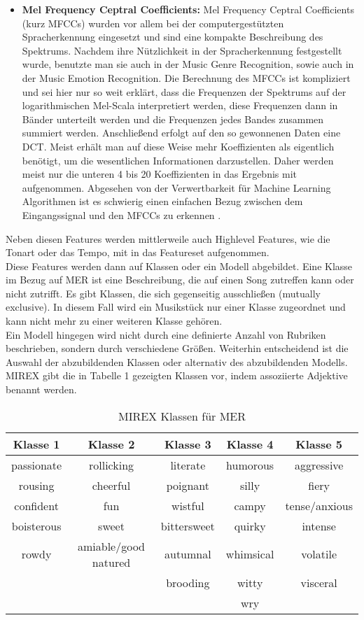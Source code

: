\documentclass[11pt,a4paper]{article}
\begin{document}
\begin{itemize}
\item \textbf{Mel Frequency Ceptral Coefficients:} Mel Frequency Ceptral Coefficients (kurz MFCCs) wurden vor allem bei der computergestützten Spracherkennung eingesetzt und sind eine kompakte Beschreibung des Spektrums. Nachdem ihre Nützlichkeit in der Spracherkennung festgestellt wurde, benutzte man sie auch in der Music Genre Recognition, sowie auch in der Music Emotion Recognition. Die Berechnung des MFCCs ist kompliziert und sei hier nur so weit erklärt, dass die Frequenzen der Spektrums auf der logarithmischen Mel-Scala interpretiert werden, diese Frequenzen dann in Bänder unterteilt werden und die Frequenzen jedes Bandes zusammen summiert werden. Anschließend erfolgt auf den so gewonnenen Daten eine DCT. Meist erhält man auf diese Weise mehr Koeffizienten als eigentlich benötigt, um die wesentlichen Informationen darzustellen. Daher werden meist nur die unteren 4 bis 20 Koeffizienten in das Ergebnis mit aufgenommen. Abgesehen von der Verwertbarkeit für Machine Learning Algorithmen ist es schwierig einen einfachen Bezug zwischen dem Eingangssignal und den MFCCs zu erkennen \cite[S. 41 ff.]{lerch2012introduction}.
\end{itemize}
Neben diesen Features werden mittlerweile auch Highlevel Features, wie die Tonart oder das Tempo, mit in das Featureset aufgenommen.\\
Diese Features werden dann auf Klassen oder ein Modell abgebildet. Eine Klasse im Bezug auf MER ist eine Beschreibung, die auf einen Song zutreffen kann oder nicht zutrifft. Es gibt Klassen, die sich gegenseitig ausschließen (mutually exclusive). In diesem Fall wird ein Musikstück nur einer Klasse zugeordnet und kann nicht mehr zu einer weiteren Klasse gehören.\\
Ein Modell hingegen wird nicht durch eine definierte Anzahl von Rubriken beschrieben, sondern durch verschiedene Größen.
Weiterhin entscheidend ist die Auswahl der abzubildenden Klassen oder alternativ des abzubildenden Modells.\\
MIREX gibt die in Tabelle 1 gezeigten Klassen vor, indem assoziierte Adjektive benannt werden.
\begin{center}
\begin{table}[h!]
\begin{tabular}{c c c c c}
\textbf{Klasse 1} & \textbf{Klasse 2} & \textbf{Klasse 3} & \textbf{Klasse 4} & \textbf{Klasse 5} \\
\hline
passionate & rollicking & literate & humorous & aggressive \\
rousing & cheerful & poignant & silly & fiery \\
confident & fun & wistful & campy & tense/anxious \\
boisterous & sweet & bittersweet & quirky & intense \\
rowdy & amiable/good natured & autumnal & whimsical & volatile \\
 & & brooding & witty & visceral \\
  & & & wry &
\end{tabular}
\caption[MIREX Music Emotion Recognition Klassen]{MIREX Klassen für MER}
\end{table}
\end{center}
\end{document}
